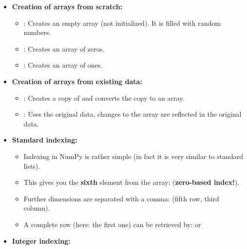 \begin{frame}
	\begin{itemize}
		\item \textbf{Creation of arrays from scratch:}
		\begin{itemize}
			\item {}: Creates an empty array (not initialized). It is filled with random numbers.
			\item {}: Creates an array of zeros.
			\item {}: Creates an array of ones.
		\end{itemize}
	\end{itemize}
	
	\begin{itemize}
		\item \textbf{Creation of arrays from existing data:}
		\begin{itemize}
			\item {}: Creates a copy of  and converts the copy to an array.
			\item {}: Uses the original data, changes to the array are reflected in the original data.
		\end{itemize}
	\end{itemize}
\end{frame}


\begin{frame}
	\begin{itemize}
		\item \textbf{Standard indexing:}
		\begin{itemize}
			\item Indexing in NumPy is rather simple (in fact it is very similar to standard lists).
			\item This gives you the \textbf{sixth} element from the array:  (\textbf{zero-based index!}).
			\item Further dimensions are separated with a comma:  (fifth row, third column).
			\item A complete row (here: the first one) can be retrieved by:  or 
		\end{itemize}
		\item \textbf{Integer indexing:}
	\end{itemize}
	
	
\end{frame}


